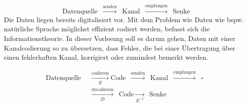 \documentclass{cheat-sheet}
\begin{document}




\[
  \text{Datenquelle} \enspace
  \xrightarrow{\text{senden}} \enspace
  \text{Kanal} \enspace
  \xrightarrow{\text{empfangen}} \enspace
  \text{Senke}
\]
Die Daten liegen bereits digitalisiert vor.
Mit dem Problem wie Daten wie bspw. natürliche Sprache möglichst effizient codiert werden, befasst sich die Informationstheorie.
In dieser Vorlesung soll es darum gehen, Daten mit einer Kanalcodierung so zu übersetzen, dass Fehler, die bei einer Übertragung über einen fehlerhaften Kanal, korrigiert oder zumindest bemerkt werden.

%


\begin{align*}
  \text{Datenquelle} \enspace
  & \xrightarrow[E]{\text{codieren}}
  \text{Code} \enspace
  \xrightarrow{\text{senden}} \enspace
  \text{Kanal} \enspace
  \xrightarrow{\text{empfangen}} \enspace
  \square \enspace \\
  & \xrightarrow[D]{\text{decodieren}} \enspace
  \text{Code}
  \xrightarrow[E^{-1}]{} \enspace
  \text{Senke}
\end{align*}







\end{document}
